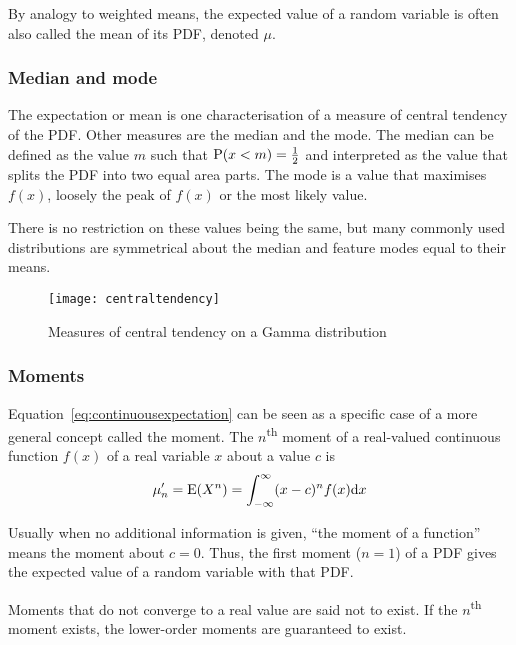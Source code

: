 By analogy to weighted means, the expected value of a random variable is often also called the mean of its PDF, denoted $\mu$.

\subsubsection{Median and mode}
The expectation or mean is one characterisation of a measure of central tendency of the PDF.
Other measures are the median and the mode.
The median can be defined as the value $m$ such that $\mathrm{P}(x<m)=\frac{1}{2}$ and interpreted as the value that splits the PDF into two equal area parts.
The mode is a value that maximises $f(x)$, loosely the peak of $f(x)$ or the most likely value.

There is no restriction on these values being the same, but many commonly used distributions are symmetrical about the median and feature modes equal to their means.

\begin{figure}[htbp]
  \centering
  \texttt{[image: centraltendency]}
  \caption{Measures of central tendency on a Gamma distribution}
  \label{fig:centraldendency}
\end{figure}

\subsubsection{Moments}
Equation~\ref{eq:continuousexpectation} can be seen as a specific case of a more general concept called the moment.
The $n$\textsuperscript{th} moment of a real-valued continuous function $f(x)$ of a real variable $x$ about a value $c$ is \citehere{}
\begin{equation}
\label{eq:moment}
\mu'_n = \mathrm{E}(X^n) = \int_{-\infty}^\infty (x - c)^n f(x) \mathrm{d} x
\end{equation}

Usually when no additional information is given, ``the moment of a function'' means the moment about $c=0$.
Thus, the first moment ($n=1$) of a PDF gives the expected value of a random variable with that PDF.

Moments that do not converge to a real value are said not to exist.
If the $n$\textsuperscript{th} moment exists, the lower-order moments are guaranteed to exist.\citehere{}

